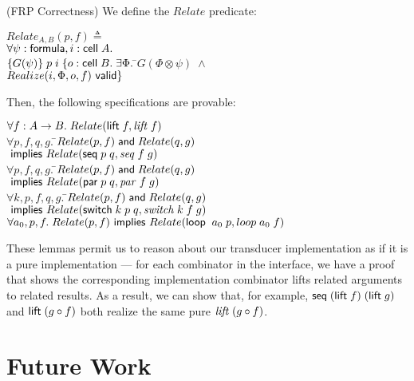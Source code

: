 \documentclass[natbib]{sigplanconf}
\begin{document}
\begin{prop}{(FRP Correctness)}
We define the $Relate$ predicate:
{\small
\begin{tabbing}
$Relate_{A,B}(p, f) \triangleq$ \\
\;\; $\forall \psi:\mbox{\textsf{{formula}}}, i:\mbox{\textsf{{cell}}}\;{A}.$ \\ 
\qquad $\{{G(\psi)}\}\;p\;i\;\{o:\mbox{\textsf{{cell}}}\;{B}.\;
               \exists \Phi.\;$\=$G(\Phi \otimes \psi) \;\land$ \\
                               \>$ Realize(i, \Phi, o, f) \mbox{\textsf{{ valid}}}\}$
\end{tabbing}
\noindent Then, the following specifications are provable: 
\begin{tabbing}
$\forall f:A\to B.\; Relate(\mbox{\textsf{{lift}}}\; f, \mathit{lift}\;f)$ \\[0.5em]

$\forall p, f, q, g.\;$\=$Relate(p, f) \;\mbox{\textsf{{and}}}\; Relate(q, g)$ \\
                       \>$\mbox{\textsf{{ implies }}} Relate(\mbox{\textsf{{seq}}}\; p\;q, \mathit{seq}\;f\;g)$ \\[0.5em]

$\forall p, f, q, g.\;$\=$Relate(p, f) \;\mbox{\textsf{{and}}}\; Relate(q, g)$ \\
                       \>$\mbox{\textsf{{ implies }}} Relate(\mbox{\textsf{{par}}}\; p\;q, \mathit{par}\;f\;g)$ \\[0.5em]

$\forall k, p, f, q, g.\;$\=$Relate(p, f) \;\mbox{\textsf{{and}}}\; Relate(q, g)$ \\
                          \>$\mbox{\textsf{{ implies }}} Relate(\mbox{\textsf{{switch}}}\; k\;p\;q, \mathit{switch}\;k\;f\;g)$ \\[0.5em]

$\forall a_0, p, f.\; 
  Relate(p, f) \mbox{\textsf{{ implies }}} Relate(\mbox{\textsf{{loop}}}\;\;a_0\;p, loop\;a_0\;f)$
\end{tabbing}
}
\end{prop}

These lemmas permit us to reason about our transducer implementation
as if it is a pure implementation --- for each combinator in the
interface, we have a proof that shows the corresponding implementation
combinator lifts related arguments to related results. As a result, 
we can show that, for example,  $\mbox{\textsf{{seq}}}\; (\mbox{\textsf{{lift}}}\; f) \;(\mbox{\textsf{{lift}}}\; g)$
and $\mbox{\textsf{{lift}}}\; (g \circ f)$ both realize the same pure $\mathit{lift}\;(g\circ f)$. 

\section{Future Work}
\end{document}
